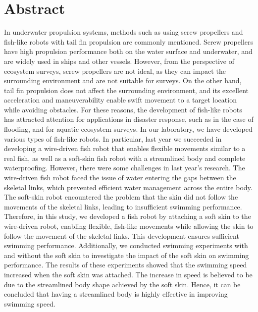 \section*{Abstract}
In underwater propulsion systems, methods such as using screw propellers and fish-like robots with tail fin propulsion are commonly mentioned. Screw propellers 
have high propulsion performance both on the water surface and underwater, and are widely used in ships and other vessels. However, from the perspective of ecosystem 
surveys, screw propellers are not ideal, as they can impact the surrounding environment and are not suitable for surveys. On the other hand, tail fin propulsion 
does not affect the surrounding environment, and its excellent acceleration and maneuverability enable swift movement to a target location while avoiding obstacles. 
For these reasons, the development of fish-like robots has attracted attention for applications in disaster response, such as in the case of flooding, and for aquatic 
ecosystem surveys.
In our laboratory, we have developed various types of fish-like robots. In particular, last year we succeeded in developing a wire-driven fish robot that enables 
flexible movements similar to a real fish, as well as a soft-skin fish robot with a streamlined body and complete waterproofing. However, there were some challenges 
in last year's research. The wire-driven fish robot faced the issue of water entering the gaps between the skeletal links, which prevented efficient water management 
across the entire body. The soft-skin robot encountered the problem that the skin did not follow the movements of the skeletal links, leading to insufficient swimming 
performance.
Therefore, in this study, we developed a fish robot by attaching a soft skin to the wire-driven robot, enabling flexible, fish-like movements while allowing the skin 
to follow the movement of the skeletal links. This development ensures sufficient swimming performance. Additionally, we conducted swimming experiments with and without 
the soft skin to investigate the impact of the soft skin on swimming performance. The results of these experiments showed that the swimming speed increased when the soft 
skin was attached. The increase in speed is believed to be due to the streamlined body shape achieved by the soft skin. Hence, it can be concluded that having a streamlined 
body is highly effective in improving swimming speed.
